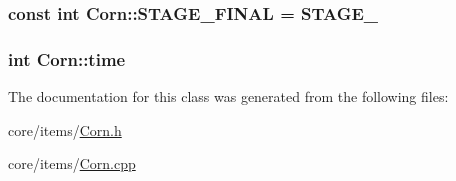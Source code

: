 \hypertarget{classCorn_ae27fd5a47e3b83c96f459eb26a9c89d9}{
\subsubsection[{S\-T\-A\-G\-E\-\_\-\-F\-I\-N\-A\-L}]{\setlength{\rightskip}{0pt plus 5cm}const int Corn\-::\-S\-T\-A\-G\-E\-\_\-\-F\-I\-N\-A\-L = {\bf S\-T\-A\-G\-E\-\_}\hspace{0.3cm}{\ttfamily [static]}}}\label{classCorn_ae27fd5a47e3b83c96f459eb26a9c89d9}
\hypertarget{classCorn_ae07bb9fe1250f25d9263e15906d05b11}{
\subsubsection[{time}]{\setlength{\rightskip}{0pt plus 5cm}int Corn\-::time}}\label{classCorn_ae07bb9fe1250f25d9263e15906d05b11}


The documentation for this class was generated from the following files\-:\begin{DoxyCompactItemize}
\item 
core/items/\hyperlink{Corn_8h}{Corn.\-h}\item 
core/items/\hyperlink{Corn_8cpp}{Corn.\-cpp}\end{DoxyCompactItemize}

